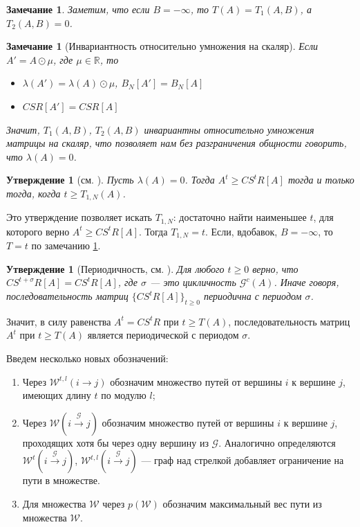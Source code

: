 \documentclass[12pt]{article}
\newtheorem{proposition}[theorem]{Утверждение}
\newtheorem{remark}[theorem]{Замечание}
\begin{document}
\begin{remark}
\label{nullB}
Заметим, что если $B = -\infty$, то $T(A) = T_1(A, B)$, а $T_2(A, B) = 0$.
\end{remark}

\begin{remark}[Инвариантность относительно умножения на скаляр]
\label{invarianceOfT}
Если $A' = A \odot \mu$, где $\mu \in \mathbb{R}$, то 
\begin{itemize}
	\item $\lambda(A') = \lambda(A) \odot \mu$, $B_N[A'] = B_N[A]$
	\item $CSR[A'] = CSR[A]$
\end{itemize}
Значит, $T_1(A, B)$, $T_2(A, B)$ инвариантны относительно умножения матрицы на скаляр, что позволяет нам без разграничения общности говорить, что $\lambda(A) = 0$.
\end{remark}

\begin{proposition} [см. \cite{bounds}]
Пусть $\lambda(A) = 0$. Тогда $A^t \ge CS^tR[A]$ тогда и только тогда, когда $t \ge T_{1,N}(A)$.
\end{proposition}

Это утверждение позволяет искать $T_{1,N}$: достаточно найти наименьшее $t$, для которого верно $A^t \ge CS^tR[A]$. Тогда $T_{1,N} = t$. Если, вдобавок, $B = -\infty$, то $T = t$ по замечанию \ref{nullB}.

\begin{proposition} [Периодичность, см. \cite{21CSRExpansionsOfMatrixPowersInMaxAlgebra}] \label{periodicity}
Для любого $t \ge 0$ верно, что 
$CS^{t+\sigma}R[A] = CS^tR[A]$, где $\sigma$ --- это цикличность $\mathcal{G}^c(A)$. Иначе говоря, последовательность матриц $\{ CS^tR[A]\}_{t\ge0}$ периодична с периодом $\sigma$.
\end{proposition}

Значит, в силу равенства $A^t = CS^tR$ при $t \ge T(A)$, последовательность матриц $A^t$ при $t \ge T(A)$ является периодической с периодом $\sigma$.

Введем несколько новых обозначений:
\begin{enumerate}
    \item Через $\mathcal{W}^{t, l}(i \rightarrow j)$ обозначим множество путей от вершины $i$ к вершине $j$, имеющих длину $t$ по модулю $l$;
    \item Через $\mathcal{W}(i \xrightarrow{\mathcal{G}} j)$ обозначим множество путей от вершины $i$ к вершине $j$, проходящих хотя бы через одну вершину из $\mathcal{G}$. Аналогично определяются $\mathcal{W}^t(i \xrightarrow{\mathcal{G}} j)$, $\mathcal{W}^{t, l}(i \xrightarrow{\mathcal{G}} j)$ --- граф над стрелкой добавляет ограничение на пути в множестве.
    \item Для множества $\mathcal{W}$ через $p(\mathcal{W})$ обозначим максимальный вес пути из множества $\mathcal{W}$.
\end{enumerate}
\end{document}
